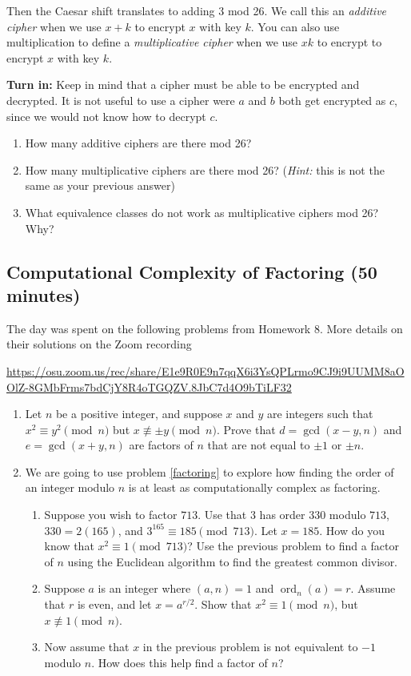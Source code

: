 \documentclass[letterpaper, 11 pt]{article}
\newcommand{\ord}{\operatorname{ord}}
\begin{document}
\noindent Then the Caesar shift translates to adding 3 mod 26. We call this an \emph{additive cipher} when we use $x+k$ to encrypt $x$ with key $k$. You can also use multiplication to define a \emph{multiplicative cipher} when we use $xk$ to encrypt to encrypt $x$ with key $k$.

{\bf Turn in:} Keep in mind that a cipher must be able to be encrypted and decrypted. It is not useful to use a cipher were $a$ and $b$ both get encrypted as $c$, since we would not know how to decrypt $c$.

\begin{enumerate}
\item  How many additive ciphers are there mod 26?
\item How many multiplicative ciphers are there mod 26? (\emph{Hint:} this is not the same as your previous answer)
\item What equivalence classes do not work as multiplicative ciphers mod 26? Why?
\end{enumerate}
\subsection{Computational Complexity of Factoring (50 minutes)}
The day was spent on the following problems from Homework 8. More details on their solutions on the Zoom recording 

\url{https://osu.zoom.us/rec/share/E1e9R0E9n7qqX6i3YsQPLrmo9CJ9i9UUMM8aOOlZ-8GMbFrms7bdCjY8R4oTGQZV.8JbC7d4O9bTiLF32}
\begin{br}
 \begin{enumerate}
 \item\label{factoring} Let $n$ be a positive integer, and suppose $x$ and $y$ are integers such that $x^2\equiv y^2\pmod n$ but $x\not\equiv \pm y \pmod n$. Prove that $d=\gcd(x-y,n)$ and $e=\gcd(x+y,n)$ are factors of $n$ that are not equal to $\pm 1$ or $\pm n$.

	\item  We are going to use problem \ref{factoring} to explore how finding the order of an integer modulo $n$ is at least as computationally complex as factoring.
\begin{enumerate}
\item Suppose you wish to factor $713$. Use that $3$ has order $330$ modulo $713$, $330=2(165)$, and $3^{165}\equiv 185 \pmod{713}$. Let $x=185$. How do you know that $x^2\equiv 1 \pmod{713}$? Use the previous problem to find a factor of $n$ using the Euclidean algorithm to find the greatest common divisor.
\item Suppose $a$ is an integer where $(a,n)=1$ and $\ord_n(a)=r$. Assume that $r$ is even, and let $x=a^{r/2}$. Show that $x^2\equiv 1 \pmod n$, but $x\not\equiv 1 \pmod n$.  
\item Now assume that $x$ in the previous problem is not equivalent to $-1$ modulo $n$. How does this help find a factor of $n$?
\end{enumerate}
\end{enumerate}

\end{br}
\end{document}
